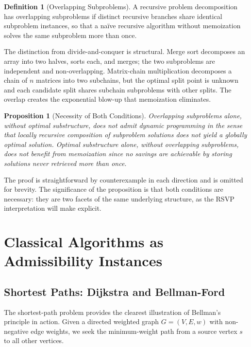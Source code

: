 \documentclass[12pt, a4paper, openany]{book}
\theoremstyle{plain}
\newtheorem{proposition}[theorem]{Proposition}
\theoremstyle{definition}
\newtheorem{definition}[theorem]{Definition}
\theoremstyle{remark}
\begin{document}
\begin{definition}[Overlapping Subproblems]
A recursive problem decomposition has overlapping subproblems if distinct recursive branches share identical subproblem instances, so that a naïve recursive algorithm without memoization solves the same subproblem more than once.
\end{definition}

The distinction from divide-and-conquer is structural. Merge sort decomposes an array into two halves, sorts each, and merges; the two subproblems are independent and non-overlapping. Matrix-chain multiplication decomposes a chain of $n$ matrices into two subchains, but the optimal split point is unknown and each candidate split shares subchain subproblems with other splits. The overlap creates the exponential blow-up that memoization eliminates.

\begin{proposition}[Necessity of Both Conditions]
Overlapping subproblems alone, without optimal substructure, does not admit dynamic programming in the sense that locally recursive composition of subproblem solutions does not yield a globally optimal solution. Optimal substructure alone, without overlapping subproblems, does not benefit from memoization since no savings are achievable by storing solutions never retrieved more than once.
\end{proposition}

The proof is straightforward by counterexample in each direction and is omitted for brevity. The significance of the proposition is that both conditions are necessary: they are two facets of the same underlying structure, as the RSVP interpretation will make explicit.

\chapter{Classical Algorithms as Admissibility Instances}

\section{Shortest Paths: Dijkstra and Bellman-Ford}

The shortest-path problem provides the clearest illustration of Bellman's principle in action. Given a directed weighted graph $G = (V, E, w)$ with non-negative edge weights, we seek the minimum-weight path from a source vertex $s$ to all other vertices.
\end{document}
